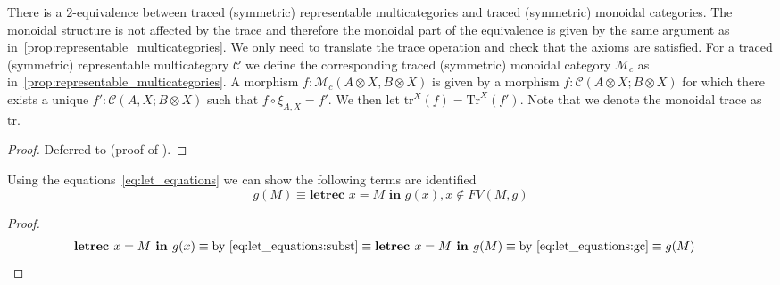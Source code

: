 \begin{proposition}

There is a $2$-equivalence between traced (symmetric) representable
multicategories and traced (symmetric) monoidal categories.
The monoidal structure is not affected by the trace and therefore the monoidal part of the equivalence is given by the same argument as in~\autoref{prop:representable_multicategories}.
We only need to translate the trace operation and check that the axioms are satisfied.
For a traced (symmetric) representable multicategory $\mathcal{C}$ we define the corresponding traced (symmetric) monoidal category $\mathcal{M}_{c}$ as in~\autoref{prop:representable_multicategories}.
A morphism $f : \mathcal{M}_{c}(A \otimes X, B \otimes X)$ is given by a morphism $f : \mathcal{C}(A \otimes X; B \otimes X)$ for which there exists a unique $f' : \mathcal{C}(A, X; B \otimes X)$ such that $f \circ \xi_{A,X} = f'$.
We then let $\text{tr}^{X}(f) = \text{Tr}^{X}(f')$.
Note that we denote the monoidal trace as $\text{tr}$.
\end{proposition}
\begin{proof}
  Deferred to  (proof of ).
\end{proof}

\begin{lemma}\label{lemma:letrec}
Using the equations~\cref{eq:let_equations} we can show the following terms are identified
\[
g(M) \equiv \textbf{letrec } x = M \textbf{ in } g(x), x \not \in FV(M,g)
\]
\end{lemma}
\begin{proof}
\begin{align*}
\textbf{letrec } x = M \textbf{ in } g(x) &\equiv \text{by~\cref{eq:let_equations:subst}} \equiv \textbf{letrec } x = M \textbf{ in } g(M) \equiv \text{by~\cref{eq:let_equations:gc}} \equiv g(M)
\end{align*}
\end{proof}

